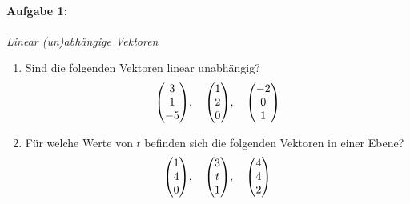 
\paragraph{Aufgabe 1: } \emph{Linear (un)abhängige Vektoren}
\begin{enumerate}[label=(\alph*)]
\item Sind die folgenden Vektoren linear unabhängig?
\begin{align*}
\mqty( 3\\1\\-5 ),\quad \mqty( 1\\2\\0 ),\quad \mqty(-2\\0\\1)
\end{align*}
\item Für welche Werte von $t$ befinden sich die folgenden Vektoren in einer Ebene?
\begin{align*}
\mqty( 1\\4\\0 ),\quad \mqty( 3\\t\\1 ),\quad \mqty( 4\\4\\2 )
\end{align*}
\end{enumerate}
%
